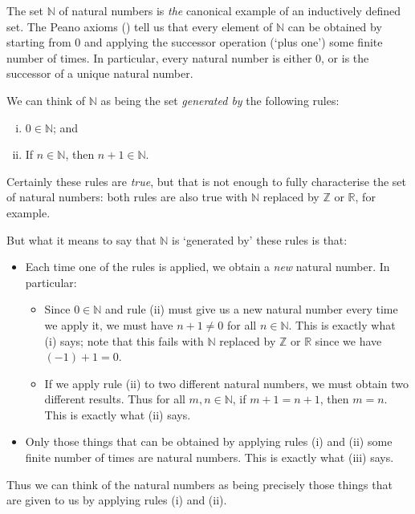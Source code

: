 \begin{example}
\label{exNaturalNumbersAsInductivelyDefinedSetPreliminary}
The set $\mathbb{N}$ of natural numbers is \textit{the} canonical example of an inductively defined set. The Peano axioms () tell us that every element of $\mathbb{N}$ can be obtained by starting from $0$ and applying the successor operation (`plus one') some finite number of times. In particular, every natural number is either $0$, or is the successor of a unique natural number.

We can think of $\mathbb{N}$ as being the set \textit{generated by} the following rules:
\begin{enumerate}[(i)]
\item $0 \in \mathbb{N}$; and
\item If $n \in \mathbb{N}$, then $n+1 \in \mathbb{N}$.
\end{enumerate}
Certainly these rules are \textit{true}, but that is not enough to fully characterise the set of natural numbers: both rules are also true with $\mathbb{N}$ replaced by $\mathbb{Z}$ or $\mathbb{R}$, for example.

But what it means to say that $\mathbb{N}$ is `generated by' these rules is that:
\begin{itemize}
\item Each time one of the rules is applied, we obtain a \textit{new} natural number. In particular:
\begin{itemize}
\item Since $0 \in \mathbb{N}$ and rule (ii) must give us a new natural number every time we apply it, we must have $n+1 \ne 0$ for all $n \in \mathbb{N}$. This is exactly what (i) says; note that this fails with $\mathbb{N}$ replaced by $\mathbb{Z}$ or $\mathbb{R}$ since we have $(-1)+1 = 0$.
\item If we apply rule (ii) to two different natural numbers, we must obtain two different results. Thus for all $m,n \in \mathbb{N}$, if $m+1=n+1$, then $m=n$. This is exactly what (ii) says.
\end{itemize}
\item Only those things that can be obtained by applying rules (i) and (ii) some finite number of times are natural numbers. This is exactly what (iii) says.
\end{itemize}

Thus we can think of the natural numbers as being precisely those things that are given to us by applying rules (i) and (ii).
\end{example}

